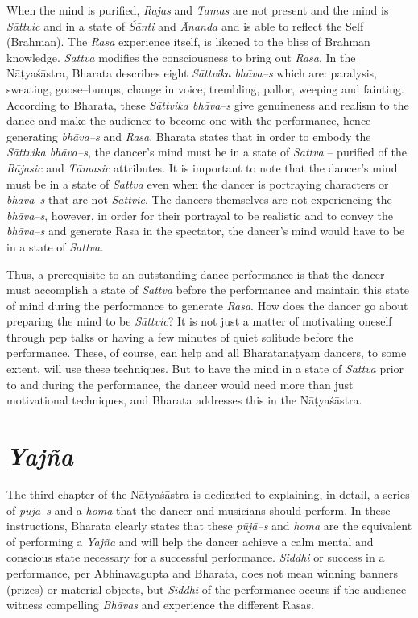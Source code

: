 When the mind is purified, \textit{Rajas }and \textit{Tamas} are not present and the mind is \textit{Sāttvic} and in a state of \textit{Śānti} and\textit{ Ānanda }and is able to reflect the Self (Brahman). The \textit{Rasa} experience itself, is likened to the bliss of Brahman knowledge. \textit{Sattva} modifies the consciousness to bring out \textit{Rasa}. In the Nāṭyaśāstra, Bharata describes eight \textit{Sāttvika} \textit{bhāva–s} which are: paralysis, sweating, goose–bumps, change in voice, trembling, pallor, weeping and fainting. According to Bharata, these \textit{Sāttvika bhāva–s} give genuineness and realism to the dance and make the audience to become one with the performance, hence generating \textit{bhāva–s} and \textit{Rasa}. Bharata states that in order to embody the \textit{Sāttvika bhāva–s}, the dancer’s mind must be in a state of \textit{Sattva} – purified of the \textit{Rājasic} and \textit{Tāmasic} attributes. It is important to note that the dancer’s mind must be in a state of \textit{Sattva} even when the dancer is portraying characters or \textit{bhāva–s} that are not \textit{Sāttvic}. The dancers themselves are not experiencing the \textit{bhāva–s}, however, in order for their portrayal to be realistic and to convey the \textit{bhāva–s} and generate Rasa in the spectator, the dancer’s mind would have to be in a state of \textit{Sattva.}

Thus, a prerequisite to an outstanding dance performance is that the dancer must accomplish a state of \textit{Sattva} before the performance and maintain this state of mind during the performance to generate \textit{Rasa}. How does the dancer go about preparing the mind to be \textit{Sāttvic}? It is not just a matter of motivating oneself through pep talks or having a few minutes of quiet solitude before the performance. These, of course, can help and all Bharatanāṭyaṃ dancers, to some extent, will use these techniques. But to have the mind in a state of \textit{Sattva} prior to and during the performance, the dancer would need more than just motivational techniques, and Bharata addresses this in the Nāṭyaśāstra.


\section*{\textit{Yajña}}

The third chapter of the Nāṭyaśāstra is dedicated to explaining, in detail, a series of \textit{pūjā–s} and a \textit{homa} that the dancer and musicians should perform. In these instructions, Bharata clearly states that these \textit{pūjā–s} and \textit{homa} are the equivalent of performing a \textit{Yajña} and will help the dancer achieve a calm mental and conscious state necessary for a successful performance. \textit{Siddhi} or success in a performance, per Abhinavagupta and Bharata, does not mean winning banners (prizes) or material objects, but \textit{Siddhi} of the performance occurs if the audience witness compelling \textit{Bhāvas} and experience the different Rasas. 

